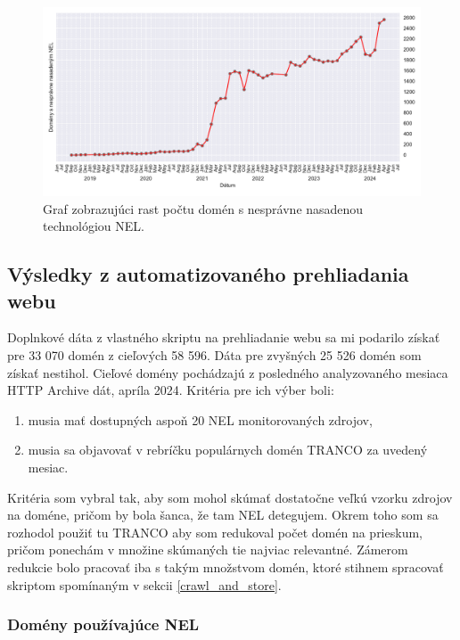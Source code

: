 \begin{figure}[!htb]
\begin{center}
 \includegraphics[scale=0.59]{obrazky-figures/httparchive_nel_deployment_incorrect.pdf}
 \caption{\centering Graf zobrazujúci rast počtu domén s nesprávne nasadenou technológiou NEL.}
 \label{fig:httparchive-nel-deployment-incorrect}
\end{center}
\end{figure}


\subsection{Výsledky z automatizovaného prehliadania webu}

Doplnkové dáta z vlastného skriptu na prehliadanie webu sa mi podarilo získať pre 33 070 domén z cieľových 58 596.
Dáta pre zvyšných 25 526 domén som získať nestihol.
Cieľové domény pochádzajú z posledného analyzovaného mesiaca HTTP Archive dát, apríla 2024.
Kritéria pre ich výber boli:
\begin{enumerate}
    \item musia mať dostupných aspoň 20 NEL monitorovaných zdrojov,
    \item musia sa objavovať v rebríčku populárnych domén TRANCO za uvedený mesiac.
\end{enumerate}
Kritéria som vybral tak, aby som mohol skúmať dostatočne veľkú vzorku zdrojov na doméne, pričom by bola šanca, že tam NEL detegujem.
Okrem toho som sa rozhodol použiť tu TRANCO aby som redukoval počet domén na prieskum, pričom ponechám v množine skúmaných tie najviac relevantné.
Zámerom redukcie bolo pracovať iba s takým množstvom domén, ktoré stihnem spracovať skriptom spomínaným v sekcii \ref{crawl_and_store}.

\subsubsection{Domény používajúce NEL}

